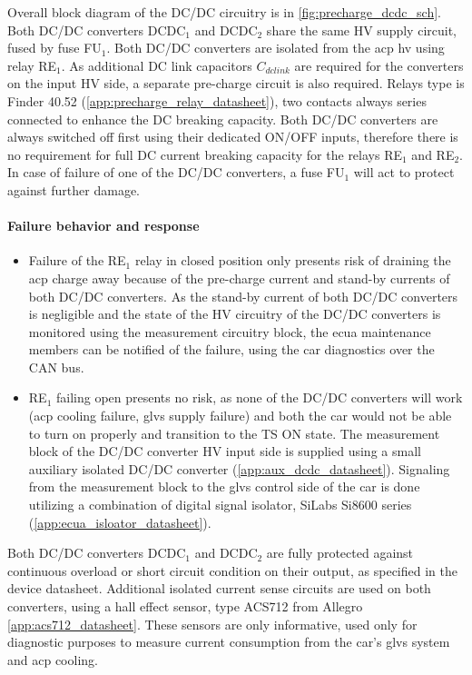 Overall block diagram of the DC/DC circuitry is in \ref{fig:precharge_dcdc_sch}. Both DC/DC converters DCDC$_1$ and DCDC$_2$ share the same HV supply circuit, fused by fuse FU$_1$. Both DC/DC converters are isolated from the \gls{acp} \gls{hv} using relay RE$_1$. As additional DC link capacitors $C_{dclink}$ are required for the converters on the input HV side, a separate pre-charge circuit is also required. 
Relays type is Finder 40.52 (\ref{app:precharge_relay_datasheet}), two contacts always series connected to enhance the DC breaking capacity. Both DC/DC converters are always switched off first using their dedicated ON/OFF inputs, therefore there is no requirement for full DC current breaking capacity for the relays RE$_1$ and RE$_2$. In case of failure of one of the DC/DC converters, a fuse FU$_1$ will act to protect against further damage. 

\paragraph{Failure behavior and response}
\begin{itemize}
	\item Failure of the RE$_1$ relay in closed position only presents risk of draining the \gls{acp} charge away because of the pre-charge current and stand-by currents of both DC/DC converters. As the stand-by current of both DC/DC converters is negligible and the state of the HV circuitry of the DC/DC converters is monitored using the measurement circuitry block, the \gls{ecua} maintenance members can be notified of the failure, using the car diagnostics over the CAN bus. 
	
	\item RE$_1$ failing open presents no risk, as none of the DC/DC converters will work (\gls{acp} cooling failure, \gls{glvs} supply failure) and both the car would not be able to turn on properly and transition to the TS ON state.
	The measurement block of the DC/DC converter HV input side is supplied using a small auxiliary isolated DC/DC converter (\ref{app:aux_dcdc_datasheet}). Signaling from the measurement block to the \gls{glvs} control side of the car is done utilizing a combination of digital signal isolator, SiLabs Si8600 series (\ref{app:ecua_isloator_datasheet}).
\end{itemize}


Both DC/DC converters DCDC$_1$ and DCDC$_2$ are fully protected against continuous overload or short circuit condition on their output, as specified in the device datasheet. Additional isolated current sense circuits are used on both converters, using a hall effect sensor, type ACS712 from Allegro \ref{app:acs712_datasheet}. These sensors are only informative, used only for diagnostic purposes to measure current consumption from the car's \gls{glvs} system and \gls{acp} cooling.

